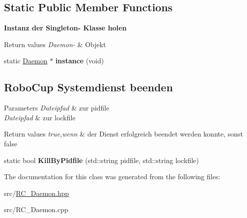 \subsection*{Static Public Member Functions}
\begin{Indent}{\bf Instanz der Singleton-\/ Klasse holen}\par
{\em 
\begin{DoxyRetVals}{Return values}
{\em Daemon-\/} & Objekt \\
\hline
\end{DoxyRetVals}
}\begin{DoxyCompactItemize}
\item 
\hypertarget{classrc_1_1Daemon_aa2428f2ddc48f857a3322da05d3c4b61}{static \hyperlink{classrc_1_1Daemon}{Daemon} $\ast$ {\bfseries instance} (void)}\label{classrc_1_1Daemon_aa2428f2ddc48f857a3322da05d3c4b61}

\end{DoxyCompactItemize}
\end{Indent}
\subsection*{Robo\+Cup Systemdienst beenden}
\label{_amgrp53b79b5f913ccbd72023be0cd06fb61f}%

\begin{DoxyParams}{Parameters}
{\em Dateipfad} & zur pidfile \\
\hline
{\em Dateipfad} & zur lockfile \\
\hline
\end{DoxyParams}

\begin{DoxyRetVals}{Return values}
{\em true,wenn} & der Dienst erfolgreich beendet werden konnte, sonst false \\
\hline
\end{DoxyRetVals}
\begin{DoxyCompactItemize}
\item 
\hypertarget{classrc_1_1Daemon_ae302feb46ccb0fc79c585082036328ba}{static bool {\bfseries Kill\+By\+Pidfile} (std\+::string pidfile, std\+::string lockfile)}\label{classrc_1_1Daemon_ae302feb46ccb0fc79c585082036328ba}

\end{DoxyCompactItemize}


The documentation for this class was generated from the following files\+:\begin{DoxyCompactItemize}
\item 
src/\hyperlink{RC__Daemon_8hpp}{R\+C\+\_\+\+Daemon.\+hpp}\item 
src/R\+C\+\_\+\+Daemon.\+cpp\end{DoxyCompactItemize}
